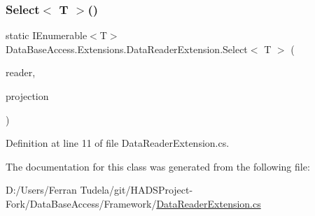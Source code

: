 \subsubsection{\texorpdfstring{Select$<$ T $>$()}{Select< T >()}}
{\footnotesize\ttfamily static I\+Enumerable$<$T$>$ Data\+Base\+Access.\+Extensions.\+Data\+Reader\+Extension.\+Select$<$ T $>$ (\begin{DoxyParamCaption}\item[{this I\+Data\+Reader}]{reader,  }\item[{Func$<$ I\+Data\+Reader, T $>$}]{projection }\end{DoxyParamCaption})\hspace{0.3cm}{\ttfamily [static]}}



Definition at line 11 of file Data\+Reader\+Extension.\+cs.



The documentation for this class was generated from the following file\+:\begin{DoxyCompactItemize}
\item 
D\+:/\+Users/\+Ferran Tudela/git/\+H\+A\+D\+S\+Project-\/\+Fork/\+Data\+Base\+Access/\+Framework/\mbox{\hyperlink{DataReaderExtension_8cs}{Data\+Reader\+Extension.\+cs}}\end{DoxyCompactItemize}
